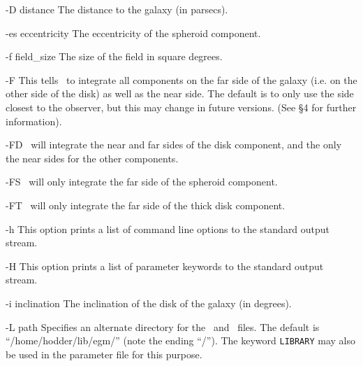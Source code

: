 \begin{clo}{-D distance}
The distance to the galaxy (in parsecs).
\end{clo}

\begin{clo}{-es eccentricity}
The eccentricity of the spheroid component.
\end{clo}

\begin{clo}{-f field\_size}
The size of the field in square degrees.
\end{clo}

\begin{clo}{-F}
This tells \egm\ to integrate all components on the far side of the galaxy 
(i.e. on the other side of the disk) as well as the near side. The default is 
to only use the side closest to the observer, but this may change in future 
versions. (See \S4 for further information).
\end{clo}

\begin{clo}{-FD}
\egm\ will integrate the near and far sides of the disk component, and the only
the near sides for the other components.
\end{clo}

\begin{clo}{-FS}
\egm\ will only integrate the far side of the spheroid component.
\end{clo}

\begin{clo}{-FT}
\egm\ will only integrate the far side of the thick disk component.
\end{clo}

\begin{clo}{-h}
This option prints a list of command line options to the standard output 
stream.
\end{clo}

\begin{clo}{-H}
This option prints a list of parameter keywords to the standard output stream.
\end{clo}

\begin{clo}{-i inclination}
The inclination of the disk of the galaxy (in degrees).
\end{clo}

\begin{clo}{-L path}
Specifies an alternate directory for the \lf\ and \cmd\ files.  The
default is  ``/home/hodder/lib/egm/''  (note the ending ``/'').  The
keyword {\tt LIBRARY}  may also be  used in the parameter file for  this
purpose.
\end{clo}

